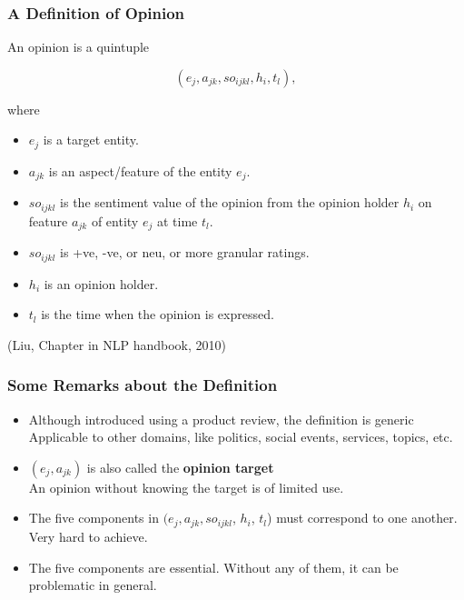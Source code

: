 \documentclass[t]{beamer}
\begin{document}
\begin{frame} \frametitle{A Definition of Opinion} %

An opinion is a quintuple 

\begin{equation*}
(e_j, a_{jk}, so_{ijkl}, h_i, t_l), 
\end{equation*}

where

\begin{itemize}
\item $e_j$ is a target entity. 
\item $a_{jk}$ is an aspect/feature of the entity $e_j$. 

\item $so_{ijkl}$ is the sentiment value of the opinion from the
  opinion holder $h_i$ on feature $a_{jk}$ of entity $e_j$ at time
  $t_l$.  

\item $so_{ijkl}$ is +ve, -ve, or neu, or more granular ratings. 
\item $h_i$ is an opinion holder. 
\item $t_l$ is the time when the opinion is expressed.
\end{itemize}

\small{(Liu, Chapter in NLP handbook, 2010)}


\end{frame} 


\begin{frame} \frametitle{Some Remarks about the Definition} %

\begin{itemize}

\item Although introduced using a product review, the definition is
  generic \\
Applicable to other domains, like politics, social events, services,
topics, etc. 

\item $(e_j, a_{jk})$ is also called the \textbf{opinion target} \\
An opinion without knowing the target is of limited use.


\item The five components in $(e_j, a_{jk}, so_{ijkl}$, $h_i$, $t_l$)
  must correspond to one another. Very hard to achieve. 

\item The five components are essential. Without any of them, it can be problematic in general.


\end{itemize}

\end{frame} 
\end{document}
